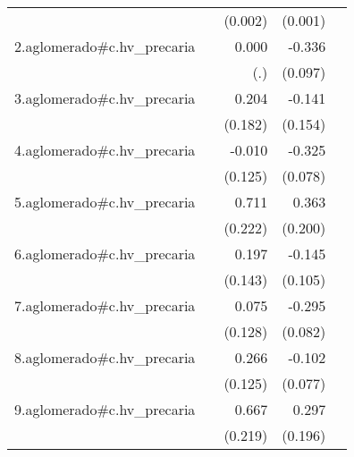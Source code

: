 {\begin{longtable}{l*{4}{D{.}{.}{-1}}}
            &                     &     (0.002)         &     (0.001)         &                     \\
\addlinespace
2.aglomerado#c.hv\_precaria&                     &       0.000         &      -0.336\sym{***}&                     \\
            &                     &         (.)         &     (0.097)         &                     \\
\addlinespace
3.aglomerado#c.hv\_precaria&                     &       0.204         &      -0.141         &                     \\
            &                     &     (0.182)         &     (0.154)         &                     \\
\addlinespace
4.aglomerado#c.hv\_precaria&                     &      -0.010         &      -0.325\sym{***}&                     \\
            &                     &     (0.125)         &     (0.078)         &                     \\
\addlinespace
5.aglomerado#c.hv\_precaria&                     &       0.711\sym{**} &       0.363         &                     \\
            &                     &     (0.222)         &     (0.200)         &                     \\
\addlinespace
6.aglomerado#c.hv\_precaria&                     &       0.197         &      -0.145         &                     \\
            &                     &     (0.143)         &     (0.105)         &                     \\
\addlinespace
7.aglomerado#c.hv\_precaria&                     &       0.075         &      -0.295\sym{***}&                     \\
            &                     &     (0.128)         &     (0.082)         &                     \\
\addlinespace
8.aglomerado#c.hv\_precaria&                     &       0.266\sym{*}  &      -0.102         &                     \\
            &                     &     (0.125)         &     (0.077)         &                     \\
\addlinespace
9.aglomerado#c.hv\_precaria&                     &       0.667\sym{**} &       0.297         &                     \\
            &                     &     (0.219)         &     (0.196)         &                     \\

\end{longtable}}
